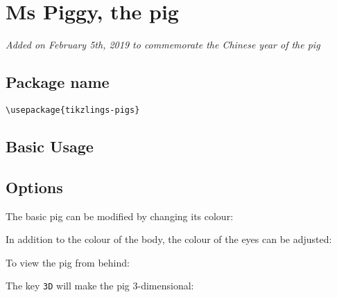 \documentclass[parskip=half]{scrartcl}
\begin{document}
%
%
\clearpage
\section[Pig]{Ms Piggy, the pig}

\emph{Added on February 5th, 2019 to commemorate the Chinese year of the pig}

\subsection{Package name}

\begin{tcolorbox}[lower separated=false, lefthand width=.8\linewidth]
\vspace*{0.5cm}
\lstinline|\usepackage{tikzlings-pigs}| 
\vspace*{0.5cm}
\end{tcolorbox}

\subsection{Basic Usage}

\begin{tcblisting}{}
\pig
\end{tcblisting}

\subsection{Options}

The basic pig can be modified by changing its colour:
\begin{tcblisting}{}
\pig[body=blue]
\end{tcblisting}

In addition to the colour of the body, the colour of the eyes can be adjusted:
\begin{tcblisting}{}
\pig[eye=red]
\end{tcblisting}

To view the pig from behind:
\begin{tcblisting}{}
\pig[back]
\end{tcblisting}

The key \lstinline|3D| will make the pig 3-dimensional:
\begin{tcblisting}{}
\pig[3D]
\end{tcblisting}
\end{document}

